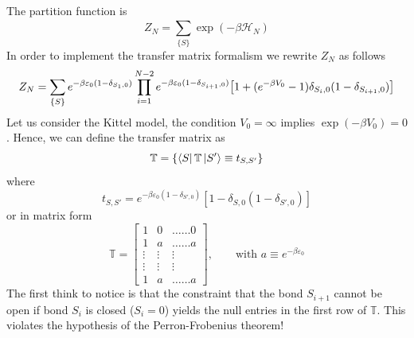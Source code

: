 \documentclass[../main/main.tex]{subfiles}
\begin{document}
The partition function is
\begin{equation*}
  Z_N = \sum_{\{ S \}  }^{} \exp (-\beta \mathcal{H}_N)
\end{equation*}
In order to implement the transfer matrix formalism we rewrite \( Z_N \) as follows
\begin{equation}
  Z_N = \sum_{\{ S \}  }^{} e^{-\beta \varepsilon _0 (1- \delta _{S_1,0})}  \prod_{i=1}^{N-2} e^{-\beta \varepsilon _0 (1- \delta _{S_{i+1},0}) }  \qty[1 + (e^{-\beta V_0}-1 ) \delta _{S_i,0}(1- \delta _{S_{i+1},0})] 
\end{equation}
Let us consider the Kittel model, the condition \( V_0 = \infty  \) implies \( \exp (-\beta V_0) = 0  \). Hence, we can define the transfer matrix as
\begin{equation}
  \mathbb{T} = \{ \bra{S} \mathbb{T} \ket{S'} \equiv t_{S,S'}   \}
\end{equation}
where
\begin{equation}
t_{S,S'} = e^{-\beta \varepsilon _0 (1- \delta _{S',0})} [1 - \delta _{S,0} (1- \delta _{S',0})]
\end{equation}
or in matrix form
\begin{equation*}
  \mathbb{T} =
  \begin{bmatrix}
    1 & 0 & \dots \dots 0 \\
    1 & a & \dots \dots a \\
    \vdots & \vdots   & \vdots \\
        \vdots & \vdots &  \vdots \\
        1 & a & \dots \dots  a
  \end{bmatrix},
  \qquad \text{with } a \equiv e^{-\beta \varepsilon _0}
\end{equation*}
The first think to notice is that the constraint that the bond \( S_{i+1} \) cannot be open if bond \( S_i \) is closed (\( S_i =0 \)) yields the null entries in the first row of \( \mathbb{T} \). This violates the hypothesis of the Perron-Frobenius theorem!
\end{document}
